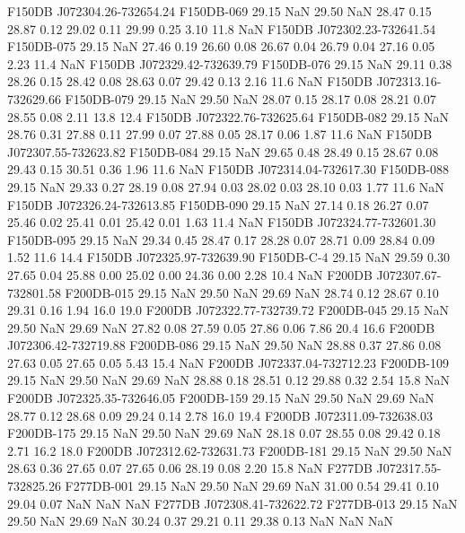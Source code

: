 F150DB J072304.26-732654.24   F150DB-069     29.15 NaN    29.50 NaN  28.47  0.15   28.87  0.12   29.02  0.11   29.99  0.25   3.10   11.8    NaN
F150DB J072302.23-732641.54   F150DB-075     29.15 NaN  27.46  0.19   26.60  0.08   26.67  0.04   26.79  0.04   27.16  0.05   2.23   11.4    NaN
F150DB J072329.42-732639.79   F150DB-076     29.15 NaN  29.11  0.38   28.26  0.15   28.42  0.08   28.63  0.07   29.42  0.13   2.16   11.6    NaN
F150DB J072313.16-732629.66   F150DB-079     29.15 NaN    29.50 NaN  28.07  0.15   28.17  0.08   28.21  0.07   28.55  0.08   2.11   13.8   12.4
F150DB J072322.76-732625.64   F150DB-082     29.15 NaN  28.76  0.31   27.88  0.11   27.99  0.07   27.88  0.05   28.17  0.06   1.87   11.6    NaN
F150DB J072307.55-732623.82   F150DB-084     29.15 NaN  29.65  0.48   28.49  0.15   28.67  0.08   29.43  0.15   30.51  0.36   1.96   11.6    NaN
F150DB J072314.04-732617.30   F150DB-088     29.15 NaN  29.33  0.27   28.19  0.08   27.94  0.03   28.02  0.03   28.10  0.03   1.77   11.6    NaN
F150DB J072326.24-732613.85   F150DB-090     29.15 NaN  27.14  0.18   26.27  0.07   25.46  0.02   25.41  0.01   25.42  0.01   1.63   11.4    NaN
F150DB J072324.77-732601.30   F150DB-095     29.15 NaN  29.34  0.45   28.47  0.17   28.28  0.07   28.71  0.09   28.84  0.09   1.52   11.6   14.4
F150DB J072325.97-732639.90   F150DB-C-4     29.15 NaN  29.59  0.30   27.65  0.04   25.88  0.00   25.02  0.00   24.36  0.00   2.28   10.4    NaN
F200DB J072307.67-732801.58   F200DB-015     29.15 NaN    29.50 NaN    29.69  NaN 28.74  0.12   28.67  0.10   29.31  0.16   1.94   16.0   19.0
F200DB J072322.77-732739.72   F200DB-045     29.15 NaN    29.50 NaN    29.69 NaN  27.82  0.08   27.59  0.05   27.86  0.06   7.86   20.4   16.6
F200DB J072306.42-732719.88   F200DB-086     29.15 NaN    29.50 NaN  28.88  0.37   27.86  0.08   27.63  0.05   27.65  0.05   5.43   15.4    NaN
F200DB J072337.04-732712.23   F200DB-109     29.15 NaN    29.50 NaN    29.69 NaN   28.88  0.18   28.51  0.12   29.88  0.32   2.54   15.8    NaN
F200DB J072325.35-732646.05   F200DB-159     29.15 NaN    29.50 NaN   29.69 NaN  28.77  0.12   28.68  0.09   29.24  0.14   2.78   16.0   19.4
F200DB J072311.09-732638.03   F200DB-175     29.15 NaN    29.50 NaN    29.69 NaN  28.18  0.07   28.55  0.08   29.42  0.18   2.71   16.2   18.0
F200DB J072312.62-732631.73   F200DB-181     29.15 NaN    29.50 NaN  28.63  0.36   27.65  0.07   27.65  0.06   28.19  0.08   2.20   15.8    NaN
F277DB J072317.55-732825.26   F277DB-001     29.15 NaN    29.50 NaN    29.69 NaN  31.00  0.54   29.41  0.10   29.04  0.07    NaN    NaN    NaN
F277DB J072308.41-732622.72   F277DB-013     29.15 NaN    29.50 NaN    29.69 NaN  30.24  0.37   29.21  0.11   29.38  0.13    NaN    NaN    NaN
